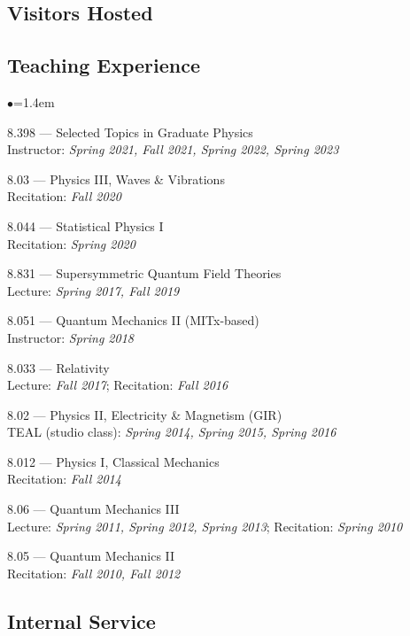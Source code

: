 \documentclass[11pt]{article}
\newcommand{\heading}[1]{\vspace{0in}\subsection*{#1} \vspace{.02in}}
\newcommand{\sh}{\phantom{...}}
\newcommand{\bbl}{\begin{list}{$\bullet$}{\leftmargin=1.4em \itemsep=-1pt}}
\newcommand{\el}{\end{list}}
\begin{document}



\heading{Visitors Hosted}




\heading{Teaching Experience}

\bbl
\item 8.398 --- Selected Topics in Graduate Physics
\\ \sh Instructor:  \textit{Spring 2021, Fall 2021, Spring 2022, Spring 2023}
\item 8.03 --- Physics III, Waves \& Vibrations
\\ \sh Recitation:  \textit{Fall 2020}
\item 8.044 --- Statistical Physics I
\\ \sh Recitation:  \textit{Spring 2020}
\item 8.831 --- Supersymmetric Quantum Field Theories
\\ \sh Lecture:  \textit{Spring 2017, Fall 2019}
\item 8.051 --- Quantum Mechanics II (MITx-based)
\\ \sh Instructor: \textit{Spring 2018}
\item 8.033 --- Relativity
\\ \sh Lecture:  \textit{Fall 2017}; Recitation:  \textit{Fall 2016}
\item 8.02 --- Physics II, Electricity \& Magnetism (GIR)
\\ \sh TEAL (studio class): \textit{Spring 2014, Spring 2015, Spring 2016}
\item 8.012 --- Physics I, Classical Mechanics
\\ \sh Recitation:  \textit{Fall 2014}
\item 8.06 --- Quantum Mechanics III
\\ \sh Lecture: \textit{Spring 2011, Spring 2012, Spring 2013}; Recitation: \textit{Spring 2010}
\item 8.05 --- Quantum Mechanics II
\\ \sh Recitation:  \textit{Fall 2010, Fall 2012}
\el


\heading{Internal Service}
\end{document}
